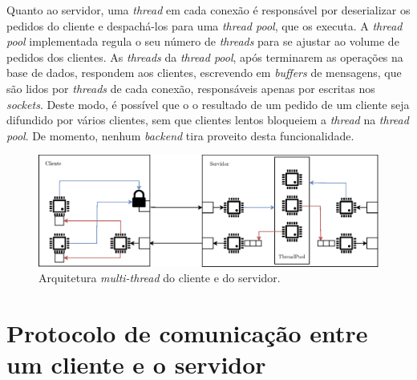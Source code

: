 \documentclass[11pt, a4paper]{article}
\begin{document}
Quanto ao servidor, uma \emph{thread} em cada conexão é responsável por deserializar os pedidos do
cliente e despachá-los para uma \emph{thread pool}, que os executa. A \emph{thread pool}
implementada regula o seu número de \emph{threads} para se ajustar ao volume de pedidos dos
clientes. As \emph{threads} da \emph{thread pool}, após terminarem as operações na base de dados,
respondem aos clientes, escrevendo em \emph{buffers} de mensagens, que são lidos por \emph{threads}
de cada conexão, responsáveis apenas por escritas nos \emph{sockets}. Deste modo, é possível que o o
resultado de um pedido de um cliente seja difundido por vários clientes, sem que clientes lentos
bloqueiem a \emph{thread} na \emph{thread pool}. De momento, nenhum \emph{backend} tira proveito
desta funcionalidade.

\begin{figure}[H]
    \centering
    \includegraphics[width=\textwidth]{res/ClientServer.eps}
    \caption{Arquitetura \emph{multi-thread} do cliente e do servidor.}
    \label{client-server-architecture}
\end{figure}

\section{Protocolo de comunicação entre um cliente e o servidor}
\end{document}

